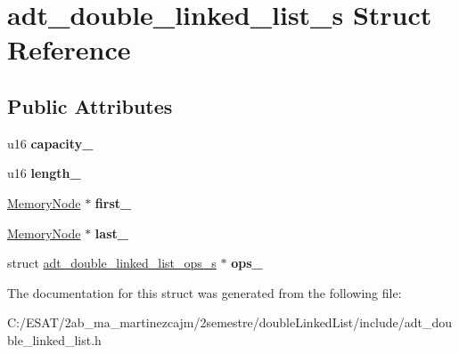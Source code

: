 \hypertarget{structadt__double__linked__list__s}{}\section{adt\+\_\+double\+\_\+linked\+\_\+list\+\_\+s Struct Reference}
\label{structadt__double__linked__list__s}
\subsection*{Public Attributes}
\begin{DoxyCompactItemize}
\item 
\mbox{\label{structadt__double__linked__list__s_a9e5a1825659be68c6c254cc4f75444fb}} 
u16 {\bfseries capacity\+\_\+}
\item 
\mbox{\label{structadt__double__linked__list__s_a43eb585d2414821d48265f60495a42ae}} 
u16 {\bfseries length\+\_\+}
\item 
\mbox{\label{structadt__double__linked__list__s_ad3236b52c664c78246edb6c28222f1ca}} 
\hyperlink{structmemory__node__s}{Memory\+Node} $\ast$ {\bfseries first\+\_\+}
\item 
\mbox{\label{structadt__double__linked__list__s_aa6b9aae469766ee467744ceb5e821fc4}} 
\hyperlink{structmemory__node__s}{Memory\+Node} $\ast$ {\bfseries last\+\_\+}
\item 
\mbox{\label{structadt__double__linked__list__s_a1f57f6586cf7b1fea7bf42875b000d1d}} 
struct \hyperlink{structadt__double__linked__list__ops__s}{adt\+\_\+double\+\_\+linked\+\_\+list\+\_\+ops\+\_\+s} $\ast$ {\bfseries ops\+\_\+}
\end{DoxyCompactItemize}


The documentation for this struct was generated from the following file\+:\begin{DoxyCompactItemize}
\item 
C\+:/\+E\+S\+A\+T/2ab\+\_\+ma\+\_\+martinezcajm/2semestre/double\+Linked\+List/include/adt\+\_\+double\+\_\+linked\+\_\+list.\+h\end{DoxyCompactItemize}
